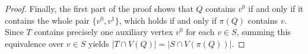 \documentclass[10pt,a4paper]{amsart}
\begin{document}
\begin{proof}
Finally, the first part of the proof shows that $Q$ contains $v^0$ if and only
if it contains the whole pair $\{v^0,v^1\}$, which holds if and only if
$\pi(Q)$ contains $v$.  Since $T$ contains precisely one auxiliary vertex
$v^0$ for each $v\in S$, summing this equivalence over $v\in S$ yields
$|T\cap V(Q)|=|S\cap V(\pi(Q))|$.
\end{proof}
\end{document}
